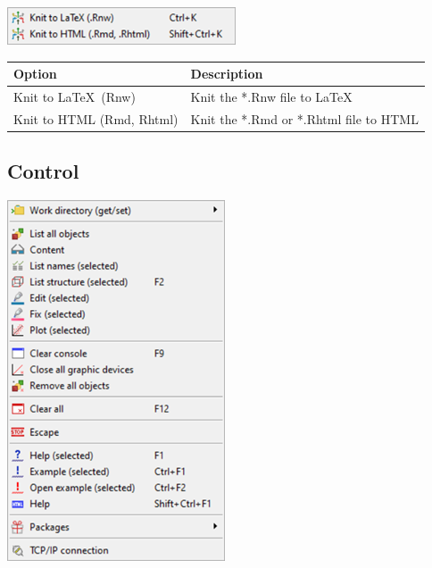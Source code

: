 \includegraphics[scale=0.50]{./res/menu_r_send_knitr.png}\\

\begin{scriptsize}
  \begin{tabularx}{\textwidth}{>{\hsize=0.3\hsize}X>{\hsize=0.7\hsize}X}\\
    \hline
    \textbf{Option} & \textbf{Description} \\
    \hline
    Knit to \LaTeX ~(Rnw) & Knit the *.Rnw file to \LaTeX \\
    Knit to HTML (Rmd, Rhtml) & Knit the *.Rmd or *.Rhtml file to HTML \\
    \hline
  \end{tabularx}
\end{scriptsize}

\hypertarget{menu_r_control}{}
\subsection{Control}

\includegraphics[scale=0.50]{./res/menu_r_control.png}\\

